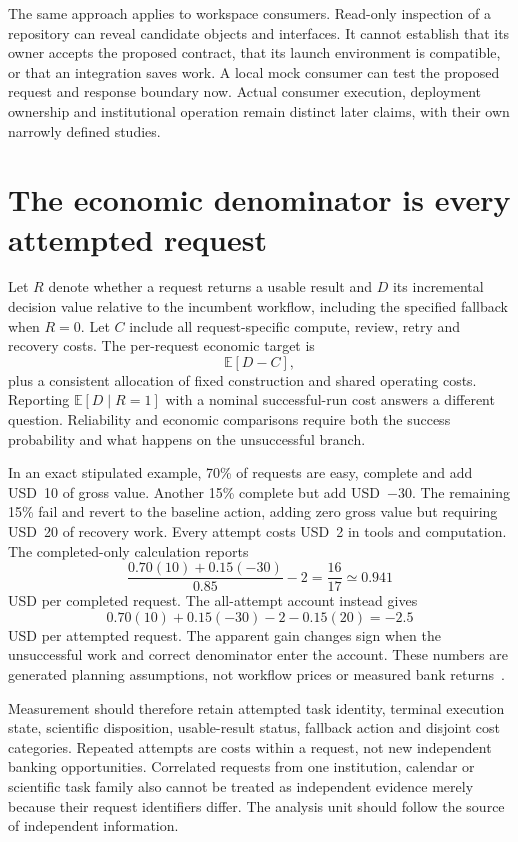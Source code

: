The same approach applies to workspace consumers. Read-only inspection of a
repository can reveal candidate objects and interfaces. It cannot establish
that its owner accepts the proposed contract, that its launch environment is
compatible, or that an integration saves work. A local mock consumer can test
the proposed request and response boundary now. Actual consumer execution,
deployment ownership and institutional operation remain distinct later
claims, with their own narrowly defined studies.

\section{The economic denominator is every attempted request}

Let $R$ denote whether a request returns a usable result and $D$ its incremental
decision value relative to the incumbent workflow, including the specified
fallback when $R=0$. Let $C$ include all request-specific compute, review,
retry and recovery costs. The per-request economic target is
\[
 \mathbb E[D-C],
\]
plus a consistent allocation of fixed construction and shared operating
costs. Reporting $\mathbb E[D\mid R=1]$ with a nominal successful-run cost
answers a different question. Reliability and economic comparisons require
both the success probability and what happens on the unsuccessful branch.

In an exact stipulated example, 70\% of requests are easy, complete and add
USD~10 of gross value. Another 15\% complete but add USD~$-30$. The remaining
15\% fail and revert to the baseline action, adding zero gross value but
requiring USD~20 of recovery work. Every attempt costs USD~2 in tools and
computation. The completed-only calculation reports
\[
 \frac{0.70(10)+0.15(-30)}{0.85}-2
 =\frac{16}{17}\simeq0.941
\]
USD per completed request. The all-attempt account instead gives
\[
 0.70(10)+0.15(-30)-2-0.15(20)=-2.5
\]
USD per attempted request. The apparent gain changes sign when the
unsuccessful work and correct denominator enter the account. These numbers
are generated planning assumptions, not workflow prices or measured bank
returns~\citep{exec13_ops_exact}.

Measurement should therefore retain attempted task identity, terminal
execution state, scientific disposition, usable-result status, fallback
action and disjoint cost categories. Repeated attempts are costs within a
request, not new independent banking opportunities. Correlated requests from
one institution, calendar or scientific task family also cannot be treated
as independent evidence merely because their request identifiers differ.
The analysis unit should follow the source of independent information.

